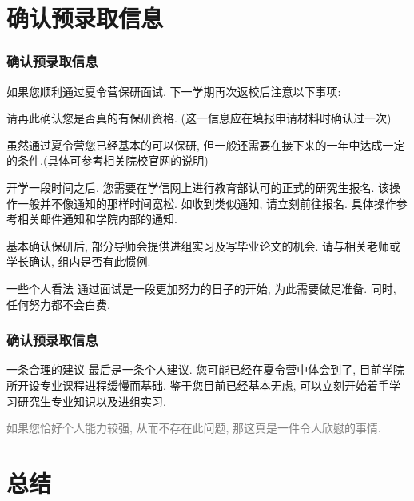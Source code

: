 \documentclass[Blue,dvipsnames]{beamer}
\begin{document}
    \section{确认预录取信息}  
    
    \begin{frame}
    \frametitle{确认预录取信息}
    如果您顺利通过夏令营保研面试, 下一学期再次返校后注意以下事项:
    \begin{description}[leftmargin=!,labelwidth=\widthof{\bfseries 录取信息确认}]
      \small
      \item[保研资格] 请再此确认您是否真的有保研资格. (这一信息应在填报申请材料时确认过一次)
      \item[保研条件] 虽然通过夏令营您已经基本的可以保研, 但一般还需要在接下来的一年中达成一定的条件.(具体可参考相关院校官网的说明)
      \item[正式申请] 开学一段时间之后, 您需要在学信网上进行教育部认可的正式的研究生报名. 该操作一般并不像通知的那样时间宽松. 如收到类似通知, 请立刻前往报名. 具体操作参考相关邮件通知和学院内部的通知.
      \item[毕业论文] 基本确认保研后, 部分导师会提供进组实习及写毕业论文的机会. 请与相关老师或学长确认, 组内是否有此惯例. 
    \end{description} 

    {
      \begin{block}{\small{一些个人看法}}
        通过面试是一段更加努力的日子的开始, 为此需要做足准备. 同时, 任何努力都不会白费. 
      \end{block}
    }
    \end{frame}
    \begin{frame}
      \frametitle{确认预录取信息}
      \begin{block}{一条合理的建议}
        最后是一条个人建议. 您可能已经在夏令营中体会到了, 目前学院所开设专业课程进程缓慢而基础. 鉴于您目前已经基本无虑, 可以立刻开始着手学习研究生专业知识以及进组实习. 
      \end{block}
      {\small\textcolor{gray}{如果您恰好个人能力较强, 从而不存在此问题, 那这真是一件令人欣慰的事情.}}
    \end{frame}

    \section{总结}  
\end{document}
